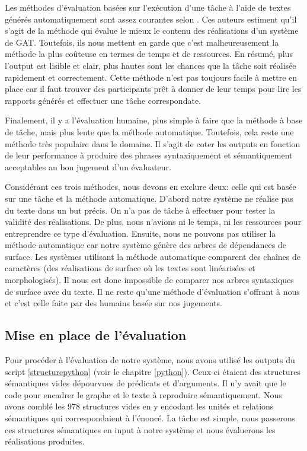 Les méthodes d'évaluation basées sur l'exécution d'une tâche à l'aide de textes générés automatiquement sont assez courantes selon \cite{ReiterInvestigationValidityMetrics2009}. Ces auteurs estiment qu'il s'agit de la méthode qui évalue le mieux le contenu des réalisations d'un système de \ac{GAT}. Toutefois, ils nous mettent en garde que c'est malheureusement la méthode la plus coûteuse en termes de temps et de ressources. En résumé, plus l'output est lisible et clair, plus hautes sont les chances que la tâche soit réalisée rapidement et correctement. Cette méthode n'est pas toujours facile à mettre en place car il faut trouver des participants prêt à donner de leur temps pour lire les rapports générés et effectuer une tâche correspondate. 

Finalement, il y a l'évaluation humaine, plus simple à faire que la méthode à base de tâche, mais plus lente que la méthode automatique. Toutefois, cela reste une méthode très populaire dans le domaine. Il s'agit de coter les outputs en fonction de leur performance à produire des phrases syntaxiquement et sémantiquement acceptables au bon jugement d'un évaluateur.

Considérant ces trois méthodes, nous devons en exclure deux: celle qui est basée sur une tâche et la méthode automatique. D'abord notre système ne réalise pas du texte dans un but précis. On n'a pas de tâche à effectuer pour tester la validité des réalisations. De plus, nous n'avions ni le temps, ni les ressources pour entreprendre ce type d'évaluation. Ensuite, nous ne pouvons pas utiliser la méthode automatique car notre système génère des arbres de dépendances de surface. Les systèmes utilisant la méthode automatique comparent des chaînes de caractères (des réalisations de surface où les textes sont linéarisées et morphologisés). Il nous est donc impossible de comparer nos arbres syntaxiques de surface avec du texte. Il ne reste qu'une méthode d'évaluation s'offrant à nous et c'est celle faite par des humains basée sur nos jugements.

\subsection{Mise en place de l'évaluation}
Pour procéder à l'évaluation de notre système, nous avons utilisé les outputs du script \ref{structurepython} (voir le chapitre \ref{python}). Ceux-ci étaient des structures sémantiques vides dépourvues de prédicats et d'arguments. Il n'y avait que le code pour encadrer le graphe et le texte à reproduire sémantiquement. Nous avons comblé les 978 structures vides en y encodant les unités et relations sémantiques qui correspondaient à l'énoncé. La tâche est simple, nous passerons ces structures sémantiques en input à notre système et nous évaluerons les réalisations produites.

